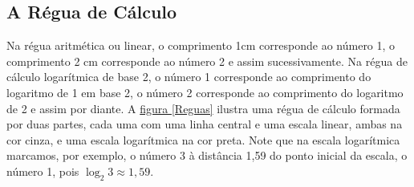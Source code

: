 \subsection{A Régua de Cálculo}

Na régua aritmética ou linear, o comprimento 1cm corresponde ao número 1, o comprimento 2 cm corresponde ao número 2 e assim sucessivamente. Na régua de cálculo logarítmica de base 2, o número 1 corresponde ao comprimento do logaritmo de 1 em base 2, o número 2 corresponde ao comprimento do logaritmo de 2 e assim por diante. A \hyperref[Reguas]{figura \ref{Reguas}}
ilustra uma régua de cálculo formada por duas partes, cada uma com uma linha central e uma escala linear, ambas na cor 
cinza, e uma escala logarítmica na cor preta. Note que na escala logarítmica marcamos, por exemplo, o número 3 à distância 1,59 do 
ponto inicial da escala, o número 1, pois $\log_2 3 \approx 1{,}59$.

